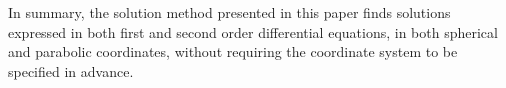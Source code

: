 \documentclass{article}
\theoremstyle{definition}
\theoremstyle{plain}
\begin{document}
In summary, the solution method presented in this paper finds solutions expressed
in both first and second order differential equations, in both spherical and parabolic coordinates,
without requiring the coordinate system to be specified in advance.

\vfill\eject

\end{document}
